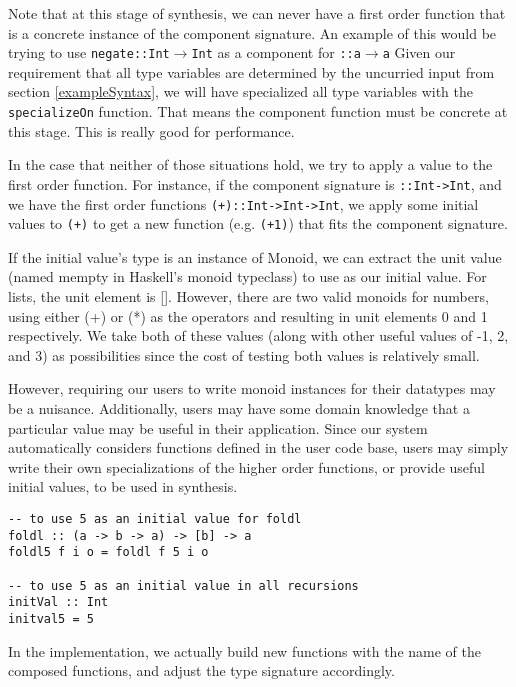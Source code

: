 Note that at this stage of synthesis, we can never have a first order function that is a concrete instance of the component signature. 
An example of this would be trying to use \texttt{negate::Int$\to$Int} as a component for \texttt{::a$\to$a}
Given our requirement that all type variables are determined by the uncurried input from section \ref{exampleSyntax}, we will have specialized all type variables with the \texttt{specializeOn} function.
That means the component function must be concrete at this stage.
This is really good for performance.


In the case that neither of those situations hold, we try to apply a value to the first order function.
For instance, if the component signature is \texttt{::Int->Int}, and we have the first order functions \texttt{(+)::Int->Int->Int}, we apply some initial values to \texttt{(+)} to get a new function (e.g. \texttt{(+1)}) that fits the component signature.

If the initial value's type is an instance of Monoid, we can extract the unit value (named mempty in Haskell's monoid typeclass\cite{}) to use as our initial value. For lists, the unit element is []. However, there are two valid monoids for numbers, using either (+) or (*) as the operators and resulting in unit elements 0 and 1 respectively. We take both of these values (along with other useful values of -1, 2, and 3) as possibilities since the cost of testing both values is relatively small.

However, requiring our users to write monoid instances for their datatypes may be a nuisance. Additionally, users may have some domain knowledge that a particular value may be useful in their application. Since our system automatically considers functions defined in the user code base, users may simply write their own specializations of the higher order functions, or provide useful initial values, to be used in synthesis. 

\begin{lstlisting}
-- to use 5 as an initial value for foldl
foldl :: (a -> b -> a) -> [b] -> a
foldl5 f i o = foldl f 5 i o

-- to use 5 as an initial value in all recursions
initVal :: Int
initval5 = 5
\end{lstlisting}


In the implementation, we actually build new functions with the name of the composed functions, and adjust the type signature accordingly.



